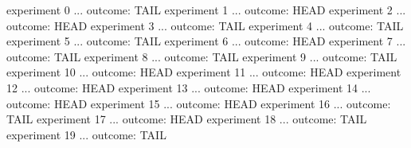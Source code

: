 experiment 0 ... outcome: TAIL
experiment 1 ... outcome: HEAD
experiment 2 ... outcome: HEAD
experiment 3 ... outcome: TAIL
experiment 4 ... outcome: TAIL
experiment 5 ... outcome: TAIL
experiment 6 ... outcome: HEAD
experiment 7 ... outcome: TAIL
experiment 8 ... outcome: TAIL
experiment 9 ... outcome: TAIL
experiment 10 ... outcome: HEAD
experiment 11 ... outcome: HEAD
experiment 12 ... outcome: HEAD
experiment 13 ... outcome: HEAD
experiment 14 ... outcome: HEAD
experiment 15 ... outcome: HEAD
experiment 16 ... outcome: TAIL
experiment 17 ... outcome: HEAD
experiment 18 ... outcome: TAIL
experiment 19 ... outcome: TAIL
